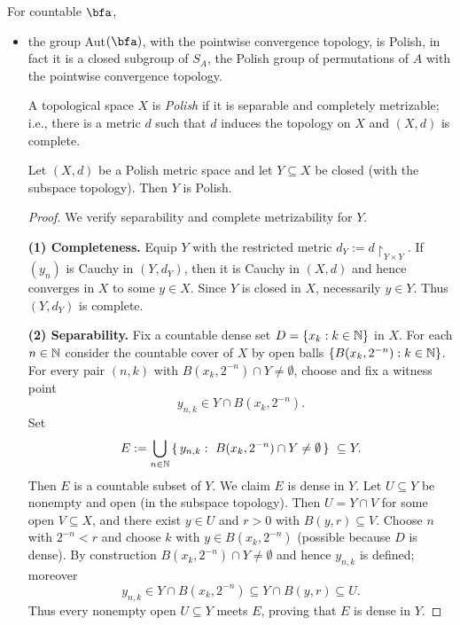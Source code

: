 \begin{theorem}
    For countable $\bfa$,
    \begin{itemize}
        \item the group Aut$(\bfa )$, with the pointwise convergence topology, is Polish, in fact it is a closed subgroup of $S_A$, the Polish group of permutations of $A$ with the pointwise convergence topology.

              \begin{mynote}
                  \begin{definition}
                      A topological space $X$ is \emph{Polish} if it is separable and completely metrizable; i.e., there is a metric $d$ such that $d$ induces the topology on $X$ and $(X,d)$ is complete.
                  \end{definition}

                  \begin{theorem}
                      Let $(X,d)$ be a Polish metric space and let $Y\subseteq X$ be closed (with the subspace topology). Then $Y$ is Polish.
                  \end{theorem}

                  \begin{proof}
                      We verify separability and complete metrizability for $Y$.

                      \smallskip
                      \noindent\textbf{(1) Completeness.}
                      Equip $Y$ with the restricted metric $d_Y:=d\!\upharpoonright_{Y\times Y}$. If $(y_n)$ is Cauchy in $(Y,d_Y)$, then it is Cauchy in $(X,d)$ and hence converges in $X$ to some $y\in X$. Since $Y$ is closed in $X$, necessarily $y\in Y$. Thus $(Y,d_Y)$ is complete.

                      \smallskip
                      \noindent\textbf{(2) Separability.}
                      Fix a countable dense set $D=\{x_k:k\in\Bbb N\}$ in $X$. For each $n\in\Bbb N$ consider the countable cover of $X$ by open balls $\{B(x_k,2^{-n}):k\in\Bbb N\}$. For every pair $(n,k)$ with $B(x_k,2^{-n})\cap Y\neq\emptyset$, choose and fix a witness point
                      \[
                          y_{n,k}\in Y\cap B(x_k,2^{-n}).
                      \]
                      Set
                      \[
                          E:=\bigcup_{n\in\Bbb N}\,\{\,y_{n,k}:\ B(x_k,2^{-n})\cap Y\neq\emptyset\,\}\ \subseteq Y.
                      \]
                      Then $E$ is a countable subset of $Y$. We claim $E$ is dense in $Y$. Let $U\subseteq Y$ be nonempty and open (in the subspace topology). Then $U=Y\cap V$ for some open $V\subseteq X$, and there exist $y\in U$ and $r>0$ with $B(y,r)\subseteq V$. Choose $n$ with $2^{-n}<r$ and choose $k$ with $y\in B(x_k,2^{-n})$ (possible because $D$ is dense). By construction $B(x_k,2^{-n})\cap Y\neq\emptyset$ and hence $y_{n,k}$ is defined; moreover
                      \[
                          y_{n,k}\in Y\cap B(x_k,2^{-n})\subseteq Y\cap B(y,r)\subseteq U.
                      \]
                      Thus every nonempty open $U\subseteq Y$ meets $E$, proving that $E$ is dense in $Y$.


\end{proof}
\end{mynote}
\end{itemize}
\end{theorem}
